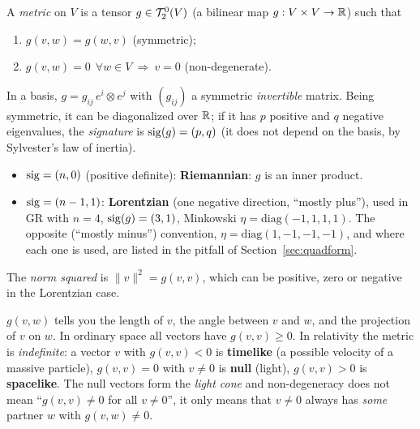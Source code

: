 \begin{formal}[{metric}]
A \emph{metric} on $V$ is a tensor $g\in\mathcal{T}^{0}_{2}(V)$ (a bilinear map $g:V\times V\to\mathbb{R}$) such that
\begin{enumerate}[label=(\roman*),nosep]
\item $g(v,w)=g(w,v)$ (symmetric);
\item $g(v,w)=0\ \ \forall w\in V\ \Rightarrow\ v=0$ (non-degenerate).
\end{enumerate}
In a basis, $g=g_{ij}\,e^{i}\otimes e^{j}$ with $(g_{ij})$ a symmetric \emph{invertible} matrix. Being symmetric, it can be diagonalized over $\mathbb{R}$; if it has $p$ positive and $q$ negative eigenvalues, the \emph{signature} is $\operatorname{sig}(g)=(p,q)$ (it does not depend on the basis, by Sylvester's law of inertia). 
\begin{itemize}[nosep]
\item $\operatorname{sig}=(n,0)$ (positive definite): \textbf{Riemannian}: $g$ is an inner product.
\item $\operatorname{sig}=(n-1,1)$: \textbf{Lorentzian} (one negative direction, ``mostly plus''), used in GR with $n=4$, $\operatorname{sig}(g)=(3,1)$, \eg Minkowski $\eta=\mathrm{diag}(-1,1,1,1)$. The opposite (``mostly minus'') convention, $\eta=\mathrm{diag}(1,-1,-1,-1)$, and where each one is used, are listed in the pitfall of Section~\ref{sec:quadform}.
\end{itemize}
The \emph{norm squared} is $\|v\|^2=g(v,v)$, which can be positive, zero or negative in the Lorentzian case.
\end{formal}

\begin{intuition}
$g(v,w)$ tells you the length of $v$, the angle between $v$ and $w$, and the projection of $v$ on $w$. In ordinary space all vectors have $g(v,v)\geq0$. In relativity the metric is \emph{indefinite}: a vector $v$ with $g(v,v)<0$ is \textbf{timelike} (a possible velocity of a massive particle), $g(v,v)=0$ with $v\ne0$ is \textbf{null} (light), $g(v,v)>0$ is \textbf{spacelike}. The null vectors form the \emph{light cone} and non-degeneracy does not mean ``$g(v,v)\neq0$ for all $v\neq0$'', it only means that $v\neq0$ always has \emph{some} partner $w$ with $g(v,w)\neq0$.
\end{intuition}

